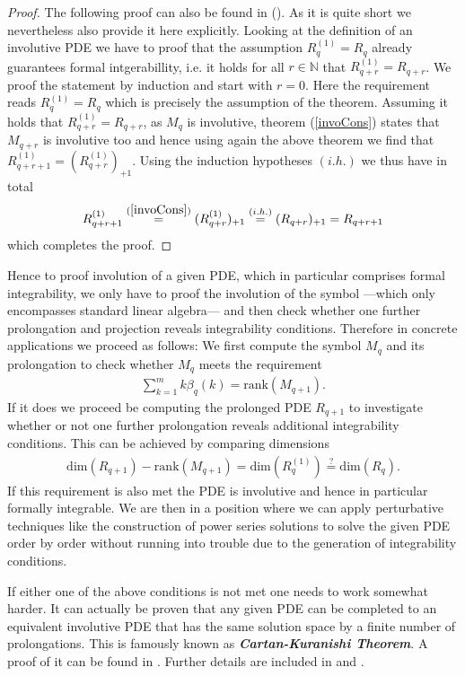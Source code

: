 \documentclass[a4paper,12pt, DIV=14, BCOR=5mm, twoside, headsepline]{scrbook}
\begin{document}
\begin{proof}
The following proof can also be found in (\cite{seiler1994analysis}). As it is quite short we nevertheless also provide it here explicitly.
Looking at the definition of an involutive PDE we have to proof that the assumption $R_q^{(1)} = R_q$ already guarantees formal intgerabillity, i.e. it holds for all $r \in \mathbb{N}$ that $R_{q+r}^(1) = R_{q+r}$. We proof the statement by induction and start with $r=0$. Here the requirement reads $R_q^{(1)}=R_q$ which is precisely the assumption of the theorem. Assuming it holds that $R_{q+r}^{(1)}=R_{q+r}$, as $M_q$ is involutive, theorem (\ref{invoCons}) states that $M_{q+r}$ is involutive too and hence using again the above theorem we find that $R_{q+r+1}^{(1)}= (R_{q+r}^{(1)})_{+1}$. Using the induction hypotheses $(i.h.)$ we thus have in total
\begin{align}
   R_{q+r+1}^{(1)} \overset{(\ref{invoCons})}{=} (R_{q+r}^{(1)})_{+1} \overset{(i.h.)}{=} (R_{q+r})_{+1} = R_{q+r+1} 
\end{align}
which completes the proof. 
\end{proof}
Hence to proof involution of a given PDE, which in  particular comprises formal integrability, we only have to proof the involution of the symbol ---which only encompasses standard linear algebra--- and then check whether one further prolongation and projection reveals integrability conditions. Therefore in concrete applications we proceed as follows: We first compute the symbol $M_q$ and its prolongation to check whether $M_q$ meets the requirement 
\begin{align}
        \sum_{k=1}^m k\beta_q(k) = \mathrm{rank}(M_{q+1}).
\end{align}
If it does we proceed be computing the prolonged PDE $R_{q+1}$ to investigate whether or not one further prolongation reveals additional integrability conditions. This can be achieved by comparing dimensions
\begin{align}
    \mathrm{dim}(R_{q+1}) - \mathrm{rank}(M_{q+1}) = \mathrm{dim}(R_q^{(1)}) \stackrel{?}{=} \mathrm{dim}(R_q).
\end{align}
If this requirement is also met the PDE is involutive and hence in particular formally integrable. We are then in a position where we can apply perturbative techniques like the construction of power series solutions to solve the given PDE order by order without running into trouble due to the generation of integrability conditions.

If either one of the above conditions is not met one needs to work somewhat harder. It can actually be proven that any given PDE can be completed to an equivalent involutive PDE that has the same solution space by a finite number of prolongations. This is famously known as \textbf{\textit{Cartan-Kuranishi Theorem}}. A proof of it can be found in \cite{sweeney1968}. Further details are included in \cite{seiler2009involution} and \cite{seiler1994analysis}.
\end{document}
